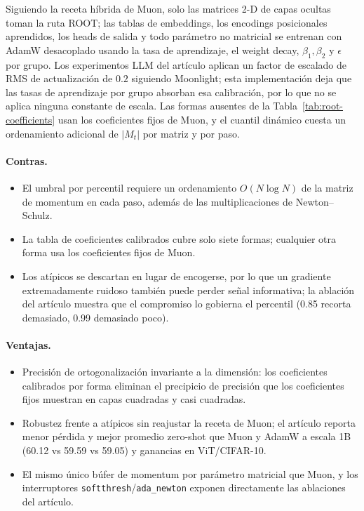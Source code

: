 Siguiendo la receta híbrida de Muon, solo las matrices 2-D de capas ocultas toman la ruta ROOT; las tablas de embeddings, los encodings posicionales aprendidos, los heads de salida y todo parámetro no matricial se entrenan con AdamW desacoplado usando la tasa de aprendizaje, el weight decay, $\beta_1, \beta_2$ y $\epsilon$ por grupo. Los experimentos LLM del artículo aplican un factor de escalado de RMS de actualización de $0.2$ siguiendo Moonlight; esta implementación deja que las tasas de aprendizaje por grupo absorban esa calibración, por lo que no se aplica ninguna constante de escala. Las formas ausentes de la Tabla~\ref{tab:root-coefficients} usan los coeficientes fijos de Muon, y el cuantil dinámico cuesta un ordenamiento adicional de $|M_t|$ por matriz y por paso.

\paragraph{Contras.}
\begin{itemize}[leftmargin=*]
\item El umbral por percentil requiere un ordenamiento $O(N\log N)$ de la matriz de momentum en cada paso, además de las multiplicaciones de Newton--Schulz.
\item La tabla de coeficientes calibrados cubre solo siete formas; cualquier otra forma usa los coeficientes fijos de Muon.
\item Los atípicos se descartan en lugar de encogerse, por lo que un gradiente extremadamente ruidoso también puede perder señal informativa; la ablación del artículo muestra que el compromiso lo gobierna el percentil (0.85 recorta demasiado, 0.99 demasiado poco).
\end{itemize}

\paragraph{Ventajas.}
\begin{itemize}[leftmargin=*]
\item Precisión de ortogonalización invariante a la dimensión: los coeficientes calibrados por forma eliminan el precipicio de precisión que los coeficientes fijos muestran en capas cuadradas y casi cuadradas.
\item Robustez frente a atípicos sin reajustar la receta de Muon; el artículo reporta menor pérdida y mejor promedio zero-shot que Muon y AdamW a escala 1B (60.12 vs 59.59 vs 59.05) y ganancias en ViT/CIFAR-10.
\item El mismo único búfer de momentum por parámetro matricial que Muon, y los interruptores \texttt{softthresh}/\texttt{ada\_newton} exponen directamente las ablaciones del artículo.
\end{itemize}

